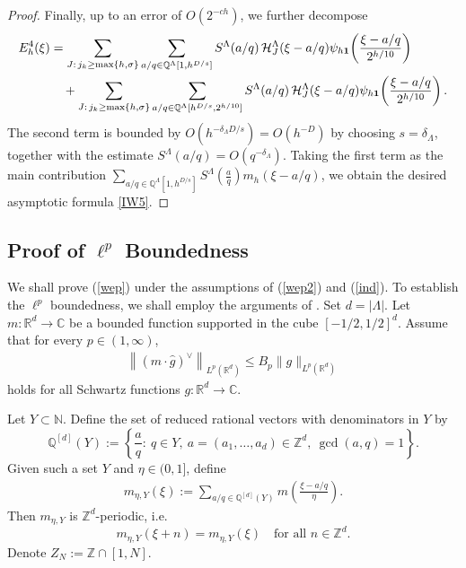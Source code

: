 \documentclass[11 pt,letterpaper]{amsart}
\theoremstyle{plain}
\theoremstyle{definition}
\theoremstyle{remark} \theoremstyle{exam} \theoremstyle{ob}
\numberwithin{equation}{section}
\begin{document}
\begin{proof}
Finally, up to an error of $O(2^{-ch})$, we further decompose
\begin{align*}
E^4_h(\xi)
&=
\sum_{J:\, j_k\ge \max\{h,\sigma\}} 
\sum_{a/q\in \mathbb{Q}^{\Lambda}[1,h^{D/s}]}  
S^{\Lambda}(a/q)\, \mathcal{H}^{\Lambda}_J(\xi-a/q)
\psi_{h{\bf 1}}\!\left(\frac{\xi-a/q}{2^{h/10}}\right)\\
&\quad+
\sum_{J:\, j_k\ge \max\{h,\sigma\}} 
\sum_{a/q\in \mathbb{Q}^{\Lambda}[h^{D/s},2^{h/10}]}  
S^{\Lambda}(a/q)\, \mathcal{H}^{\Lambda}_J(\xi-a/q)
\psi_{h{\bf 1}}\!\left(\frac{\xi-a/q}{2^{h/10}}\right).
\end{align*}
The second term is bounded by $O(h^{-\delta_{\Lambda} D/s})=O(h^{-D})$ by choosing $s=\delta_{\Lambda}$, together with the estimate $S^{\Lambda}(a/q)=O(q^{-\delta_{\Lambda}})$. 
Taking the first term as the main contribution $ 
 \sum_{a/q\in \mathbb{Q}^{\Lambda}[1,h^{D/s}]} S^{\Lambda}\!\left(\frac{a}{q}\right) m_{h}( \xi-a/q )$, we obtain the desired asymptotic formula \eqref{IW5}.
\end{proof}


 

















 


\subsection{Proof of $\ell^{p}$ Boundedness}
We shall prove (\ref{wep}) under the assumptions of   (\ref{wep2}) and  (\ref{ind}).
To establish the $\ell^p$ boundedness, we shall employ the arguments of \cite{IW}. 
Set $d=|\Lambda|$. Let $m:\mathbb{R}^{d}\to\mathbb{C}$ be a bounded function supported in the cube $[-1/2,1/2]^d$. 
Assume that for every $p\in(1,\infty)$,
\begin{align}\label{IW1}
\left\|(m \cdot \widehat{g})^{\vee}\right\|_{L^{p}(\mathbb{R}^{d})}
\leq B_{p}\|g\|_{L^{p}(\mathbb{R}^{d})}
\end{align}
holds for all Schwartz functions $g:\mathbb{R}^{d}\to\mathbb{C}$.

Let $Y\subset \mathbb{N}$. Define the set of reduced rational vectors with denominators in $Y$ by
\[
\mathbb{Q}^{[d]}(Y)
:=\left\{\frac{a}{q}:\ q\in Y,\ a=(a_1,\dots,a_d)\in\mathbb{Z}^{d},\ \gcd(a,q)=1\right\}.
\]
Given such a set $Y$ and $\eta\in(0,1]$, define
\begin{align}\label{91k}
m_{\eta,Y}(\xi)
:=\sum_{a/q\in \mathbb{Q}^{[d]}(Y)} m\!\left(\frac{\xi-a/q}{\eta}\right).
\end{align}
Then $m_{\eta,Y}$ is $\mathbb{Z}^d$-periodic, i.e.
\[
m_{\eta,Y}(\xi+n)=m_{\eta,Y}(\xi)\quad \text{for all } n\in\mathbb{Z}^d.
\]
Denote $Z_N:=\mathbb{Z}\cap[1,N]$.
\end{document}
